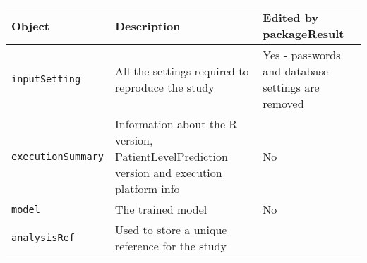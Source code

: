 \documentclass[
]{article}
\begin{document}
\begin{longtable}[]{@{}lll@{}}
\toprule
\begin{minipage}[b]{0.23\columnwidth}\raggedright
Object\strut
\end{minipage} & \begin{minipage}[b]{0.51\columnwidth}\raggedright
Description\strut
\end{minipage} & \begin{minipage}[b]{0.17\columnwidth}\raggedright
Edited by packageResult\strut
\end{minipage}\tabularnewline
\midrule
\endhead
\begin{minipage}[t]{0.23\columnwidth}\raggedright
\texttt{inputSetting}\strut
\end{minipage} & \begin{minipage}[t]{0.51\columnwidth}\raggedright
All the settings required to reproduce the study\strut
\end{minipage} & \begin{minipage}[t]{0.17\columnwidth}\raggedright
Yes - passwords and database settings are removed\strut
\end{minipage}\tabularnewline
\begin{minipage}[t]{0.23\columnwidth}\raggedright
\texttt{executionSummary}\strut
\end{minipage} & \begin{minipage}[t]{0.51\columnwidth}\raggedright
Information about the R version, PatientLevelPrediction version and
execution platform info\strut
\end{minipage} & \begin{minipage}[t]{0.17\columnwidth}\raggedright
No\strut
\end{minipage}\tabularnewline
\begin{minipage}[t]{0.23\columnwidth}\raggedright
\texttt{model}\strut
\end{minipage} & \begin{minipage}[t]{0.51\columnwidth}\raggedright
The trained model\strut
\end{minipage} & \begin{minipage}[t]{0.17\columnwidth}\raggedright
No\strut
\end{minipage}\tabularnewline
\begin{minipage}[t]{0.23\columnwidth}\raggedright
\texttt{analysisRef}\strut
\end{minipage} & \begin{minipage}[t]{0.51\columnwidth}\raggedright
Used to store a unique reference for the study\strut

\end{minipage}
\end{longtable}
\end{document}
